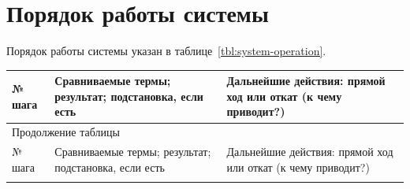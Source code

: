 \section{Порядок работы системы}
Порядок работы системы указан в таблице~\ref{tbl:system-operation}.

\begin{center}
    \begin{tabularx}{\textwidth}{|X|X|X|}
        \caption{\label{tbl:system-operation}Порядок работы системы} \\ \hline
        № шага & Сравниваемые термы; результат; подстановка, если есть & Дальнейшие действия: прямой ход или откат (к чему приводит?) \\ \hline
        \endfirsthead

        \multicolumn{3}{l}{{Продолжение таблицы\ \thetable{}}} \\ \hline
        № шага & Сравниваемые термы; результат; подстановка, если есть & Дальнейшие действия: прямой ход или откат (к чему приводит?) \\ \hline
        \endhead

        \hline
        \endfoot
        \endlastfoot


\end{tabularx}
\end{center}
